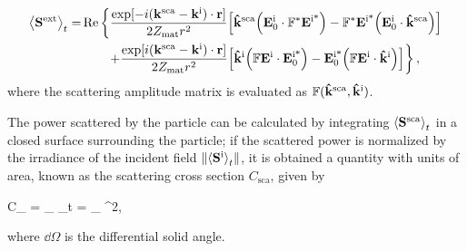 %
 \begin{align}
 \ev{\vb{S}^\text{ext}}_t = &\Re\left\{
								\frac{\exp[-i(\vb{k}^\text{sca}-\vb{k}^\text{i})\cdot\vb{r}]}{2 Z_\text{mat}r^2}
								\qty[\vu{k}^\text{sca}\qty(\vb{E}_0^\text{i}\cdot \mathbb{F}^*\vb{E}^\text{i*})
									-\mathbb{F}^*\vb{E}^\text{i*}	\qty(\vb{E}^\text{i}_0\cdot\vu{k}^\text{sca})]
							 \right.\notag	\\
							&\hspace{2em}\left.
								+\frac{\exp[i(\vb{k}^\text{sca}-\vb{k}^\text{i})\cdot\vb{r}]}{2 Z_\text{mat}r^2}
								\qty[\vu{k}^\text{i}\qty(\mathbb{F}\vb{E}^\text{i}\cdot\vb{E}^\text{i*}_0)
									-\vb{E}^\text{i*}_0 \qty(\mathbb{F}\vb{E}^\text{i}\cdot\vu{k}^\text{i})]	\right\},
 \label{eq:AvePoyntingExt}
\end{align}%
where the scattering amplitude matrix is evaluated as $\mathbb{F}(\vu{k}^\text{sca},\vu{k}^\text{i})$.

The power scattered by the particle can be calculated by integrating $\ev{\vb{S}^\text{sca}}_t$ in a closed surface surrounding the particle; if the scattered power is normalized by the irradiance of the incident field $\norm{\ev{\vb{S}^\text{i}}_t}$, it is obtained a quantity with units of area, known as the scattering cross section $C_\text{sca}$, given by \cite{bohren_absorption_1983}%
%
%
%
 \begin{tcolorbox}[title = Scattering Cross Section,	ams align, breakable]
	C_ =  \oint_ _t \cdot{}
				= \oint_ 
									{^2}\dd{\Omega},
 \label{eq:Csca}
 \end{tcolorbox}
%
\noindent
where $\dd{\Omega}$ is the differential solid angle.

